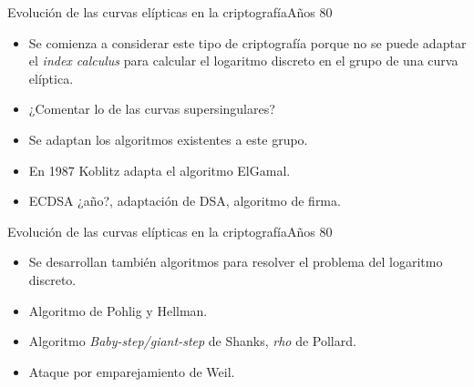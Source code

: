 \documentclass[spanish]{beamer}
\begin{document}
\begin{frame}[fragile]{Evolución de las curvas elípticas en la criptografía}{Años 80}
  \begin{itemize}
    \item Se comienza a considerar este tipo de criptografía porque no se puede adaptar el \textit{index calculus} para calcular el logaritmo discreto en el grupo de una curva elíptica.
    \item ¿Comentar lo de las curvas supersingulares?
    \item Se adaptan los algoritmos existentes a este grupo.
    \item En 1987 Koblitz adapta el algoritmo ElGamal.
    \item ECDSA ¿año?, adaptación de DSA, algoritmo de firma.
  \end{itemize}
\end{frame}

\begin{frame}[fragile]{Evolución de las curvas elípticas en la criptografía}{Años 80}
  \begin{itemize}
    \item Se desarrollan también algoritmos para resolver el problema del logaritmo discreto. %
    \item Algoritmo de Pohlig y Hellman.
    \item Algoritmo \textit{Baby-step/giant-step} de Shanks, \textit{rho} de Pollard. %
    \item Ataque por emparejamiento de Weil. %
  \end{itemize}

\end{frame}
\end{document}

